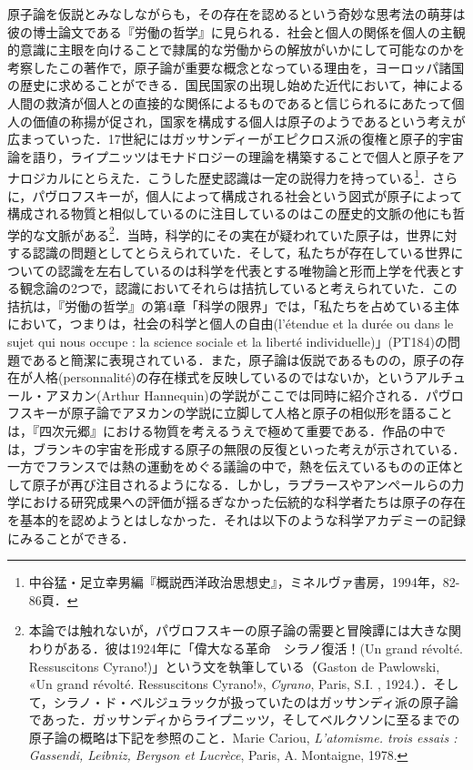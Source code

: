 原子論を仮説とみなしながらも，その存在を認めるという奇妙な思考法の萌芽は彼の博士論文である『労働の哲学』に見られる．社会と個人の関係を個人の主観的意識に主眼を向けることで隷属的な労働からの解放がいかにして可能なのかを考察したこの著作で，原子論が重要な概念となっている理由を，ヨーロッパ諸国の歴史に求めることができる．国民国家の出現し始めた近代において，神による人間の救済が個人との直接的な関係によるものであると信じられるにあたって個人の価値の称揚が促され，国家を構成する個人は原子のようであるという考えが広まっていった．17世紀にはガッサンディーがエピクロス派の復権と原子的宇宙論を語り，ライプニッツはモナドロジーの理論を構築することで個人と原子をアナロジカルにとらえた．こうした歴史認識は一定の説得力を持っている\footnote{中谷猛・足立幸男編『概説西洋政治思想史』，ミネルヴァ書房，1994年，82-86頁．}．さらに，パヴロフスキーが，個人によって構成される社会という図式が原子によって構成される物質と相似しているのに注目しているのはこの歴史的文脈の他にも哲学的な文脈がある\footnote{本論では触れないが，パヴロフスキーの原子論の需要と冒険譚には大きな関わりがある．彼は1924年に「偉大なる革命　シラノ復活！(Un grand révolté. Ressuscitons Cyrano!)」という文を執筆している（Gaston de Pawlowski, «Un grand révolté. Ressuscitons Cyrano!», \emph{Cyrano}, Paris, S.I. , 1924.）．そして，シラノ・ド・ベルジュラックが扱っていたのはガッサンディ派の原子論であった．ガッサンディからライプニッツ，そしてベルクソンに至るまでの原子論の概略は下記を参照のこと．Marie Cariou, \emph{L'atomisme. trois essais : Gassendi, Leibniz, Bergson et Lucrèce}, Paris, A. Montaigne, 1978.}．当時，科学的にその実在が疑われていた原子は，世界に対する認識の問題としてとらえられていた．そして，私たちが存在している世界についての認識を左右しているのは科学を代表とする唯物論と形而上学を代表とする観念論の2つで，認識においてそれらは拮抗していると考えられていた．この拮抗は，『労働の哲学』の第4章「科学の限界」では，「私たちを占めている主体において，つまりは，社会の科学と個人の自由(l'étendue et la durée ou dans le sujet qui nous occupe : la science sociale et la liberté individuelle)」(PT184)の問題であると簡潔に表現されている．また，原子論は仮説であるものの，原子の存在が人格(personnalité)の存在様式を反映しているのではないか，というアルチュール・アヌカン(Arthur Hannequin)の学説がここでは同時に紹介される．パヴロフスキーが原子論でアヌカンの学説に立脚して人格と原子の相似形を語ることは，『四次元郷』における物質を考えるうえで極めて重要である．作品の中では，ブランキの宇宙を形成する原子の無限の反復といった考えが示されている．一方でフランスでは熱の運動をめぐる議論の中で，熱を伝えているものの正体として原子が再び注目されるようになる．しかし，ラプラースやアンペールらの力学における研究成果への評価が揺るぎなかった伝統的な科学者たちは原子の存在を基本的を認めようとはしなかった．それは以下のような科学アカデミーの記録にみることができる．

